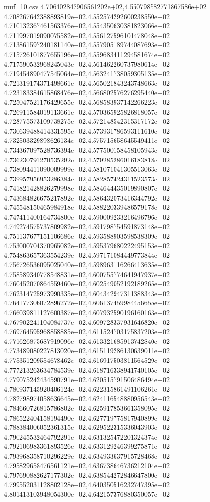 \begin{filecontents*}{muf_10.csv}
4.706402843906561202e+02,4.550798582771867586e+02
4.708267642388893819e+02,4.552574292600238550e+02
4.710132367461563376e+02,4.554350630381823066e+02
4.711997019090075582e+02,4.556127596101478048e+02
4.713861597240181140e+02,4.557905189744087693e+02
4.715726101877655196e+02,4.559683411294581674e+02
4.717590532968245043e+02,4.561462260737980614e+02
4.719454890477545064e+02,4.563241738059305135e+02
4.721319174371498661e+02,4.565021843243748663e+02
4.723183384615868476e+02,4.566802576276295440e+02
4.725047521176429655e+02,4.568583937142266223e+02
4.726911584019113661e+02,4.570365925826818057e+02
4.728775573109738275e+02,4.572148542315317172e+02
4.730639488414331595e+02,4.573931786593111610e+02
4.732503329898626134e+02,4.575715658645549411e+02
4.734367097528736394e+02,4.577500158458105943e+02
4.736230791270535292e+02,4.579285286016183818e+02
4.738094411090009999e+02,4.581071041305513063e+02
4.739957956953286384e+02,4.582857424311523573e+02
4.741821428826279998e+02,4.584644435019890807e+02
4.743684826675217892e+02,4.586432073416344792e+02
4.745548150465984918e+02,4.588220339486579178e+02
4.747411400164734800e+02,4.590009233216496796e+02
4.749274575737809982e+02,4.591798754591873148e+02
4.751137677151106686e+02,4.593588903598538309e+02
4.753000704370965082e+02,4.595379680222495153e+02
4.754863657363554239e+02,4.597171084449773844e+02
4.756726536095025040e+02,4.598963116266413635e+02
4.758589340778548831e+02,4.600755774641947937e+02
4.760452070864559460e+02,4.602549052192189265e+02
4.762314725973990335e+02,4.604342947311388343e+02
4.764177306072896272e+02,4.606137459984456655e+02
4.766039811127600387e+02,4.607932590196160163e+02
4.767902241104084737e+02,4.609728337931646820e+02
4.769764595968858885e+02,4.611524703175837203e+02
4.771626875687919096e+02,4.613321685913742840e+02
4.773489080227813020e+02,4.615119286130639011e+02
4.775351209554678462e+02,4.616917503811564529e+02
4.777213263634784539e+02,4.618716338941740105e+02
4.779075242434590791e+02,4.620515791506486494e+02
4.780937145920406124e+02,4.622315861491106261e+02
4.782798974058636645e+02,4.624116548880956543e+02
4.784660726815786802e+02,4.625917853661358095e+02
4.786522404158194490e+02,4.627719775817940899e+02
4.788384006052361315e+02,4.629522315336043903e+02
4.790245532464792291e+02,4.631325472201324374e+02
4.792106983361893526e+02,4.633129246399275871e+02
4.793968358710296229e+02,4.634933637915728468e+02
4.795829658476561121e+02,4.636738646736212104e+02
4.797690882627177302e+02,4.638544272846647800e+02
4.799552031128802128e+02,4.640350516232747395e+02
4.801413103948054300e+02,4.642157376880350057e+02

\end{filecontents*}

